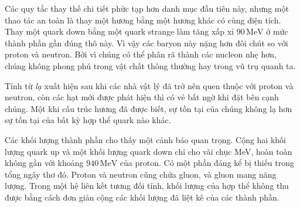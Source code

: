 \begin{classroomqa}
\end{classroomqa}

Các quy tắc thay thế chi tiết phức tạp hơn danh mục đầu tiên này, nhưng một thao tác an toàn là thay một hương bằng một hương khác có cùng điện tích. Thay một quark down bằng một quark strange làm tăng xấp xỉ \(90\,\mathrm{MeV}\) ở mức thành phần gần đúng thô này. Vì vậy các baryon này nặng hơn đôi chút so với proton và neutron. Bởi vì chúng có thể phân rã thành các nucleon nhẹ hơn, chúng không phong phú trong vật chất thông thường hay trong vũ trụ quanh ta.

\begin{classroomqa}
\end{classroomqa}

\begin{classroomqa}
\end{classroomqa}

Tính từ \emph{lạ} xuất hiện sau khi các nhà vật lý đã trở nên quen thuộc với proton và neutron, còn các hạt mới được phát hiện thì có vẻ bất ngờ khi đặt bên cạnh chúng. Một khi cấu trúc hương đã được biết, sự tồn tại của chúng không lạ hơn sự tồn tại của bất kỳ hợp thể quark nào khác.

Các khối lượng thành phần cho thấy một cảnh báo quan trọng. Cộng hai khối lượng quark up và một khối lượng quark down chỉ cho vài chục MeV, hoàn toàn không gần với khoảng \(940\,\mathrm{MeV}\) của proton. Có một phần đáng kể bị thiếu trong tổng ngây thơ đó. Proton và neutron cũng chứa gluon, và gluon mang năng lượng. Trong một hệ liên kết tương đối tính, khối lượng của hợp thể không thu được bằng cách đơn giản cộng các khối lượng đã liệt kê của các thành phần.

